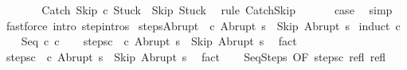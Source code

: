 \begin{isabellebody}
\isanewline
\ \ \isamarkupfalse%
\isanewline
\ \ \isamarkupfalse%
\ {\isachardoublequoteopen}{\isasymGamma}{\isasymturnstile}\ {\isacharparenleft}Catch\ Skip\ c\ Stuck{\isacharparenright}\ {\isasymrightarrow}\ {\isacharparenleft}Skip{\isacharcomma}\ Stuck{\isacharparenright}{\isachardoublequoteclose}\ \isamarkupfalse%
\ {\isacharparenleft}rule\ CatchSkip{\isacharparenright}\ \isanewline
\ \ \isamarkupfalse%
\ \isamarkupfalse%
\ {\isacharquery}case\ \isamarkupfalse%
\ simp\isanewline
{}\isamarkupfalse%
\ {\isacharparenleft}fastforce\ intro{\isacharcolon}\ step{\isachardot}intros{\isacharparenright}{\isacharplus}%
\endisatagproof
{\isafoldproof}%
%
\isadelimproof
\isanewline
%
\endisadelimproof
\isanewline
{}\isamarkupfalse%
\ steps{\isacharunderscore}Abrupt{\isacharcolon}\ {\isachardoublequoteopen}{\isasymGamma}{\isasymturnstile}\ {\isacharparenleft}c{\isacharcomma}\ Abrupt\ s{\isacharparenright}\ {\isasymrightarrow}\isactrlsup {\isacharasterisk}\ {\isacharparenleft}Skip{\isacharcomma}\ Abrupt\ s{\isacharparenright}{\isachardoublequoteclose}\isanewline
%
\isadelimproof
%
\endisadelimproof
%
\isatagproof
{}\isamarkupfalse%
\ {\isacharparenleft}induct\ c{\isacharparenright}\isanewline
\ \ \isamarkupfalse%
\ {\isacharparenleft}Seq\ c\ c\isanewline
\ \ \isamarkupfalse%
\ steps{\isacharunderscore}c\ {\isachardoublequoteopen}{\isasymGamma}{\isasymturnstile}\ {\isacharparenleft}c\ Abrupt\ s{\isacharparenright}\ {\isasymrightarrow}\isactrlsup {\isacharasterisk}\ {\isacharparenleft}Skip{\isacharcomma}\ Abrupt\ s{\isacharparenright}{\isachardoublequoteclose}\ \isamarkupfalse%
\ fact\isanewline
\ \ \isamarkupfalse%
\ steps{\isacharunderscore}c\ {\isachardoublequoteopen}{\isasymGamma}{\isasymturnstile}\ {\isacharparenleft}c\ Abrupt\ s{\isacharparenright}\ {\isasymrightarrow}\isactrlsup {\isacharasterisk}\ {\isacharparenleft}Skip{\isacharcomma}\ Abrupt\ s{\isacharparenright}{\isachardoublequoteclose}\ \isamarkupfalse%
\ fact\isanewline
\ \ \isamarkupfalse%
\ SeqSteps\ {\isacharbrackleft}OF\ steps{\isacharunderscore}c\ refl\ refl{\isacharbrackright}\isanewline

\end{isabellebody}
